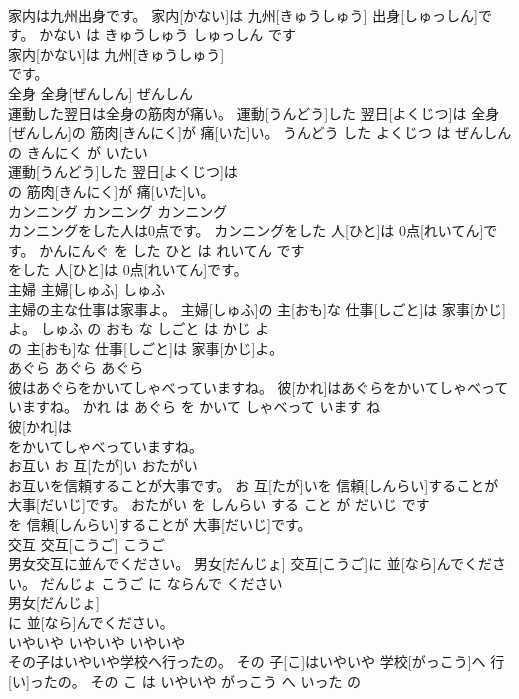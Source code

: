 \documentclass[8pt]{extreport}
\begin{document}
\begin{CJK}{UTF8}{min}
\\	家内は九州出身です。	家内[かない]は 九州[きゅうしゅう] 出身[しゅっしん]です。	かない は きゅうしゅう しゅっしん です	
\\	家内[かない]は 九州[きゅうしゅう]
\\	です。			
\\	全身	全身[ぜんしん]	ぜんしん	
\\	運動した翌日は全身の筋肉が痛い。	運動[うんどう]した 翌日[よくじつ]は 全身[ぜんしん]の 筋肉[きんにく]が 痛[いた]い。	うんどう した よくじつ は ぜんしん の きんにく が いたい	
\\	運動[うんどう]した 翌日[よくじつ]は
\\	の 筋肉[きんにく]が 痛[いた]い。			
\\	カンニング	カンニング	カンニング	
\\	カンニングをした人は0点です。	カンニングをした 人[ひと]は 0点[れいてん]です。	かんにんぐ を した ひと は れいてん です	
\\	をした 人[ひと]は 0点[れいてん]です。			
\\	主婦	主婦[しゅふ]	しゅふ	
\\	主婦の主な仕事は家事よ。	主婦[しゅふ]の 主[おも]な 仕事[しごと]は 家事[かじ]よ。	しゅふ の おも な しごと は かじ よ	
\\	の 主[おも]な 仕事[しごと]は 家事[かじ]よ。			
\\	あぐら	あぐら	あぐら	
\\	彼はあぐらをかいてしゃべっていますね。	彼[かれ]はあぐらをかいてしゃべっていますね。	かれ は あぐら を かいて しゃべって います ね	
\\	彼[かれ]は
\\	をかいてしゃべっていますね。			
\\	お互い	お 互[たが]い	おたがい	
\\	お互いを信頼することが大事です。	お 互[たが]いを 信頼[しんらい]することが 大事[だいじ]です。	おたがい を しんらい する こと が だいじ です	
\\	を 信頼[しんらい]することが 大事[だいじ]です。			
\\	交互	交互[こうご]	こうご	
\\	男女交互に並んでください。	男女[だんじょ] 交互[こうご]に 並[なら]んでください。	だんじょ こうご に ならんで ください	
\\	男女[だんじょ]
\\	に 並[なら]んでください。			
\\	いやいや	いやいや	いやいや	
\\	その子はいやいや学校へ行ったの。	その 子[こ]はいやいや 学校[がっこう]へ 行[い]ったの。	その こ は いやいや がっこう へ いった の	

\end{CJK}
\end{document}

